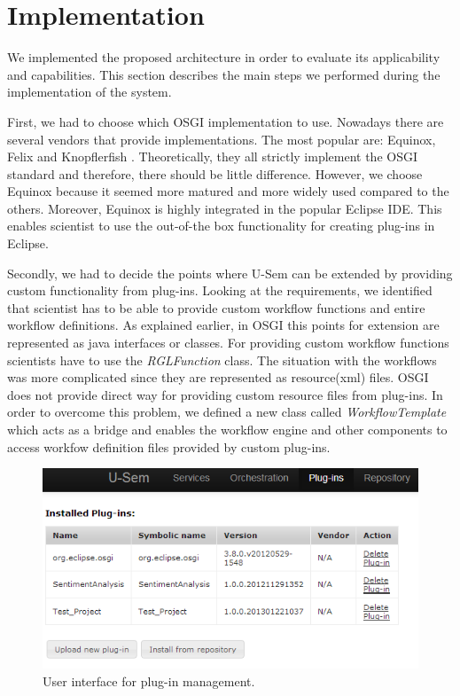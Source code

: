 \section{Implementation}
\label{sec:impl}

We implemented the proposed architecture in order to evaluate its applicability and capabilities. This section describes the main steps we performed during the implementation of the system.

First, we had to choose which OSGI implementation to use. Nowadays there are several vendors that provide implementations. The most popular are: Equinox, Felix and Knopflerfish \cite{OSGI}. Theoretically, they all strictly implement the OSGI standard and therefore, there should be little difference. However, we choose Equinox because it seemed more matured and more widely used compared to the others. Moreover, Equinox is highly integrated in the popular Eclipse IDE. This enables scientist to use the out-of-the box functionality for creating plug-ins in Eclipse.

Secondly, we had to decide the points where U-Sem can be extended by providing custom functionality from plug-ins. Looking at the requirements, we identified that scientist has to be able to provide custom workflow functions and entire workflow definitions. As explained earlier, in OSGI this points for extension are represented as java interfaces or classes. For providing custom workflow functions scientists have to use the \textit{RGLFunction} class. The situation with the workflows was more complicated since they are represented as resource(xml) files. OSGI does not provide direct way for providing custom resource files from plug-ins. In order to overcome this problem, we defined a new class called \textit{WorkflowTemplate} which acts as a bridge and enables the workflow engine and other components to access workfow definition files provided by custom plug-ins.

\begin{figure}[h!]
  \centering
  	\includegraphics[scale=0.70]{plug-in/ui/list.png}
  \caption{User interface for plug-in management.}
  \label{list_ui}
\end{figure}

